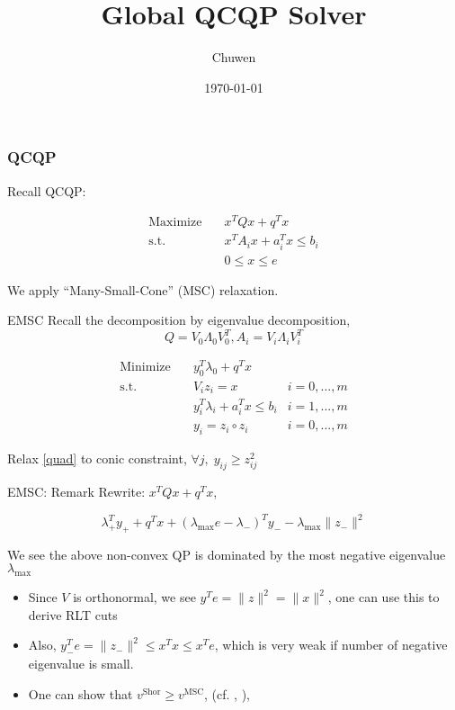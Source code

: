 
\usepackage{subfig}
\usepackage[style=authoryear]{biblatex}
\usepackage{bm}
\title{Global QCQP Solver}
\author{Chuwen}
\date{\today}




\fontsize{10pt}{11.2}\selectfont
\frame{\titlepage}



\begin{frame}
  \frametitle{QCQP}
  Recall QCQP:

  \begin{equation}
    \begin{aligned}
      \mathrm{Maximize}\quad & x^TQx + q^T x                   \\
      \mathrm{s.t.}  \quad   & x^{T} A_i x  + a_i^Tx   \le b_i \\
                             & 0\le x\le e
    \end{aligned}
  \end{equation}

  We apply ``Many-Small-Cone'' (MSC) relaxation.
\end{frame}


\begin{frame}{EMSC}
  Recall the decomposition by eigenvalue decomposition,
  \[Q = V_0\Lambda_0 V_0 ^T, A_i = V_i\Lambda_i V_i^T \]

  \begin{align}
    \nonumber \mathrm{Minimize}\quad & y_0 ^T\lambda_0 + q^Tx                         \\
    \mathrm{s.t.} \quad              & V_i z_i = x                        & i=0,...,m \\
                                     & y_i ^T\lambda_i  + a_i^Tx  \le b_i & i=1,...,m \\
    \label{quad}                     & y_i = z_i \circ z_i                & i=0,...,m
  \end{align}

  Relax \eqref{quad} to conic constraint, \(\forall j, \; y_{ij} \ge z^2_{ij}\)
\end{frame}



\begin{frame}{EMSC: Remark}
  Rewrite:  \(x^TQx + q^T x \),

  \[\lambda_+ ^T y_+ + q^Tx + (\lambda_{\max} e - \lambda_-)^T y_- - \lambda_{\max} \|z_-\|^2  \]

  We see the above non-convex QP is dominated by the most negative eigenvalue \(\lambda_{\max}\)
  \begin{itemize}
    \item Since \(V\) is orthonormal, we see \(y^Te = \|z\|^2 = \|x\|^2\), one can use this to derive RLT cuts
    \item Also, \(y_-^Te= \|z_-\|^2 \le x^Tx \le x^Te \), which is very weak if number of negative eigenvalue is small.
    \item One can show that \(v^{\mathrm{Shor}} \ge v^{\mathrm{MSC}}\), (cf. \cite{luo_new_2019}, \cite{luo_new_2021}),
  \end{itemize}
\end{frame}

